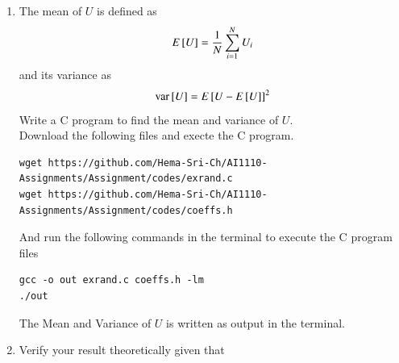 \documentclass[journal,12pt,twocolumn]{article}
\renewcommand\thesection{\arabic{section}}
\begin{document}
\begin{enumerate}[label=\thesection.\arabic*
,ref=\thesection.\theenumi]
Hence, the CDF of a uniform distribution function is given as follows in a particular interval (a, b) is given by,
\begin{align}
	F_U(x) &= \int_{-\infty}^{x} f(x) \, dx \\
		&= \begin{cases} \int_{-\infty}^{x} 0 \, dx &, x < 0 \\
		\int_{0}^{x} \, dx &, 0 \leq x \leq 1 \\
		\int_{0}^{1} \, dx &, x > 1 
		\end{cases} \\
		&= \begin{cases}0 &, x<0 \\
		1[x]_{0}^{x} &, 0 \leq x \leq 1 \\
		1[x]_{0}^{1} + 0 &, x >1\end{cases} \\
	\implies F_U(x)	&= \begin{cases} 0 &, \text{ for } x < 0\\
	x &, \text{ for } 0 \leq x \leq 1 \\
	 1 &, \text{ for } x > 1\end{cases}
\end{align}

In Our case, the intervel is (0, 1). Hence the theoretical expression for $F_U(x)$ is given as follows,

\begin{align}
	F_U(x) &= \begin{cases} 0 &, \text{ for } x < 0\\
	 x &, \text{ for } 0 \leq x \leq 1 \\
	 1 &, \text{ for } x > 1\end{cases}
\end{align}

\item
The mean of $U$ is defined as
%
\begin{equation}
E{}\left[U\right] = \frac{1}{N}\sum_{i=1}^{N}U_i
\end{equation}
%
and its variance as
%
\begin{equation}
\text{var}{}\left[U\right] = E{}\left[U- E{}\left[U\right]\right]^2 
\end{equation}
Write a C program to  find the mean and variance of $U$. 
\\
\solution Download the following files and execte the C program.
\begin{lstlisting}
wget https://github.com/Hema-Sri-Ch/AI1110-Assignments/Assignment/codes/exrand.c
wget https://github.com/Hema-Sri-Ch/AI1110-Assignments/Assignment/codes/coeffs.h
\end{lstlisting}
And run the following commands in the terminal to execute the C program files
\begin{lstlisting}
gcc -o out exrand.c coeffs.h -lm
./out
\end{lstlisting}
The Mean and Variance of $U$ is written as output in the terminal.

\item Verify your result theoretically given that
\end{enumerate}
\end{document}
